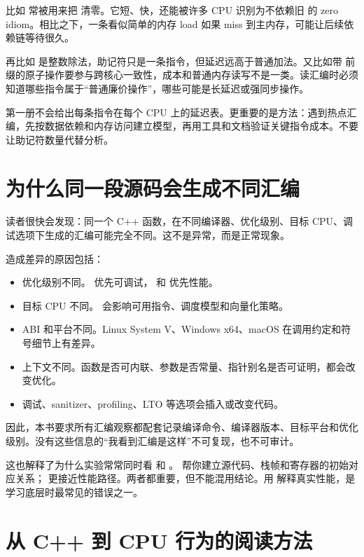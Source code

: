 比如  常被用来把  清零。它短、快，还能被许多 CPU 识别为不依赖旧  的 zero idiom。相比之下，一条看似简单的内存 load 如果 miss 到主内存，可能让后续依赖链等待很久。

再比如  是整数除法，助记符只是一条指令，但延迟远高于普通加法。又比如带  前缀的原子操作要参与跨核心一致性，成本和普通内存读写不是一类。读汇编时必须知道哪些指令属于“普通廉价操作”，哪些可能是长延迟或强同步操作。

第一册不会给出每条指令在每个 CPU 上的延迟表。更重要的是方法：遇到热点汇编，先按数据依赖和内存访问建立模型，再用工具和文档验证关键指令成本。不要让助记符数量代替分析。

\section{为什么同一段源码会生成不同汇编}

读者很快会发现：同一个 C++ 函数，在不同编译器、优化级别、目标 CPU、调试选项下生成的汇编可能完全不同。这不是异常，而是正常现象。

造成差异的原因包括：

\begin{itemize}
  \item 优化级别不同。  优先可调试， 和  优先性能。
  \item 目标 CPU 不同。  会影响可用指令、调度模型和向量化策略。
  \item ABI 和平台不同。Linux System V、Windows x64、macOS 在调用约定和符号细节上有差异。
  \item 上下文不同。函数是否可内联、参数是否常量、指针别名是否可证明，都会改变优化。
  \item 调试、sanitizer、profiling、LTO 等选项会插入或改变代码。
\end{itemize}

因此，本书要求所有汇编观察都配套记录编译命令、编译器版本、目标平台和优化级别。没有这些信息的“我看到汇编是这样”不可复现，也不可审计。

这也解释了为什么实验常常同时看  和 。  帮你建立源代码、栈帧和寄存器的初始对应关系； 更接近性能路径。两者都重要，但不能混用结论。用  解释真实性能，是学习底层时最常见的错误之一。

\section{从 C++ 到 CPU 行为的阅读方法}

